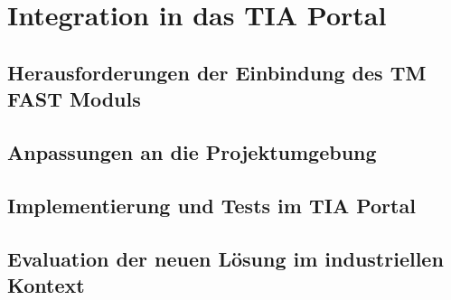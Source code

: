 \chapter{Integration in das TIA Portal}
\section{Herausforderungen der Einbindung des TM FAST Moduls}
\section{Anpassungen an die Projektumgebung}
\section{Implementierung und Tests im TIA Portal}
\section{Evaluation der neuen Lösung im industriellen Kontext}